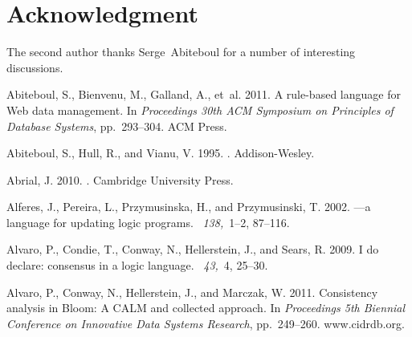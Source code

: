 \documentclass{tlp}
\begin{document}
\section*{Acknowledgment}

The second author thanks Serge~Abiteboul for a number of interesting
discussions.


\begin{thebibliography}{}

{\sc Abiteboul, S.}, {\sc Bienvenu, M.}, {\sc Galland, A.}, {\sc et~al.} 2011.
\newblock A rule-based language for {W}eb data management.
\newblock In {\em Proceedings 30th ACM Symposium on Principles of Database
  Systems}, pp.\  293--304. ACM Press.

{\sc Abiteboul, S.}, {\sc Hull, R.}, {\sc and} {\sc Vianu, V.} 1995.
.
\newblock Addison-Wesley.

{\sc Abrial, J.} 2010.
.
\newblock Cambridge University Press.

{\sc Alferes, J.}, {\sc Pereira, L.}, {\sc Przymusinska, H.}, {\sc and} {\sc
  Przymusinski, T.} 2002.
---a language for updating logic programs.
~{\em 138,\/}~1--2, 87--116.

{\sc Alvaro, P.}, {\sc Condie, T.}, {\sc Conway, N.}, {\sc Hellerstein, J.},
  {\sc and} {\sc Sears, R.} 2009.
\newblock I do declare: consensus in a logic language.
~{\em 43,\/}~4, 25--30.

{\sc Alvaro, P.}, {\sc Conway, N.}, {\sc Hellerstein, J.}, {\sc and} {\sc
  Marczak, W.} 2011.
\newblock Consistency analysis in {Bloom}: A {CALM} and collected approach.
\newblock In {\em Proceedings 5th Biennial Conference on Innovative Data
  Systems Research}, pp.\  249--260. www.cidrdb.org.


\end{thebibliography}
\end{document}
